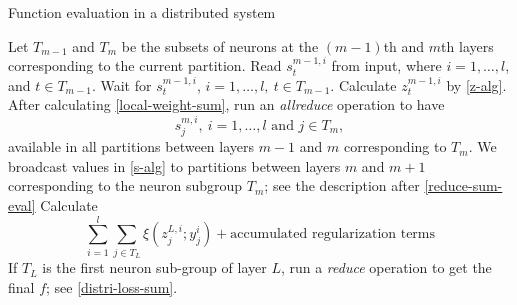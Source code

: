 \documentclass[12pt]{article}
\renewcommand{\baselinestretch}{2}
\begin{document}
\begin{algorithm}[t]
  \caption{Function evaluation in a distributed system}
  \begin{algorithmic}[1]
		\State Let $T_{m-1}$ and $T_m$ be the subsets of neurons at the $(m-1)$th and $m$th layers corresponding to the current partition.
        \State Read $s^{m-1,i}_t$ from input, where $i=1,\ldots,l$, and $t \in T_{m-1}$.
        \Else
        \State Wait for $s^{m-1,i}_t$, $i=1,\ldots,l,\ t \in T_{m-1}$. 
		\State Calculate $z^{m-1,i}_t$ by \eqref{z-alg}. 
        \EndIf
		\State After calculating \eqref{local-weight-sum}, run an {\it allreduce} operation to have
			\begin{equation}
			\label{s-alg} 
				s^{m,i}_j,\ i = 1, \ldots, l \text{ and } j \in T_m,
			\end{equation}
	    \Statex available in all partitions between layers $m-1$ and $m$ corresponding to $T_m$.
				\State We broadcast values in \eqref{s-alg} to partitions between layers $m$ and $m+1$
                \Statex \indent \indent \hspace{2ex} corresponding to the neuron subgroup $T_{m}$; see the description after \eqref{reduce-sum-eval}
			\Else
				\State Calculate
				\begin{equation*}
					\sum_{i=1}^l \sum_{j \in T_L} \xi(z^{L,i}_j;y^i_j) + \text{accumulated regularization terms}
				\end{equation*}
				\State If $T_L$ is the first neuron sub-group of layer $L$, run a {\it reduce} operation 
				\Statex \indent \indent \hspace{2ex} to get the final $f$; see \eqref{distri-loss-sum}.
			\EndIf
        \EndIf
  \end{algorithmic}
  \label{alg:eval}
\end{algorithm}
\renewcommand{\baselinestretch}{2}
\end{document}
